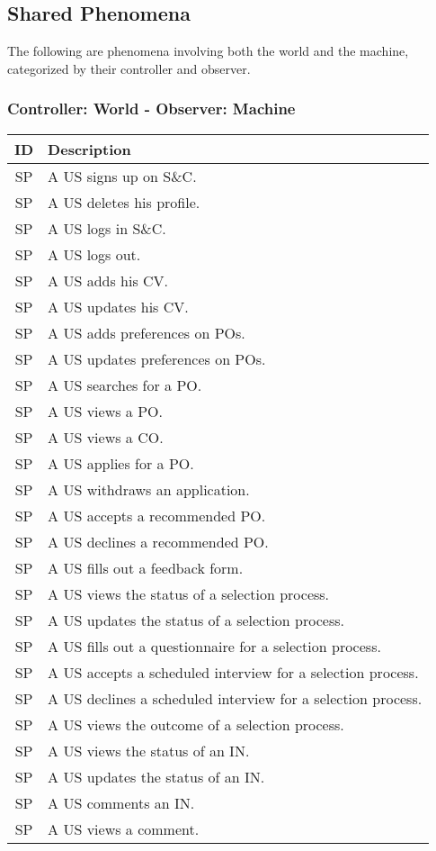 \subsection{Shared Phenomena}
The following are phenomena involving both the world and the machine, categorized by their controller and observer.

\subsubsection{Controller: World - Observer: Machine}
\setcounter{sp}{1}
\newcommand{\spc}{\thesp\stepcounter{sp}}
\renewcommand{\arraystretch}{1.5}
\begin{longtable}{|c|p{10.5cm}|}
    \hline \rowcolor{polimiblue!40}
    \textbf{ID} & \textbf{Description} \\ \hline
    SP\spc & A US signs up on S\&C. \\ \hline
    SP\spc & A US deletes his profile.\\ \hline
    SP\spc & A US logs in S\&C. \\ \hline
    SP\spc & A US logs out. \\ \hline
    SP\spc & A US adds his CV. \\ \hline
    SP\spc & A US updates his CV. \\ \hline
    SP\spc & A US adds preferences on POs. \\ \hline
    SP\spc & A US updates preferences on POs. \\ \hline
    SP\spc & A US searches for a PO. \\ \hline
    SP\spc & A US views a PO. \\ \hline
    SP\spc & A US views a CO. \\ \hline
    SP\spc & A US applies for a PO. \\ \hline
    SP\spc & A US withdraws an application. \\ \hline
    SP\spc & A US accepts a recommended PO. \\ \hline
    SP\spc & A US declines a recommended PO. \\ \hline
    SP\spc & A US fills out a feedback form. \\ \hline
    SP\spc & A US views the status of a selection process. \\ \hline
    SP\spc & A US updates the status of a selection process. \\ \hline
    SP\spc & A US fills out a questionnaire for a selection process. \\ \hline
    SP\spc & A US accepts a scheduled interview for a selection process. \\ \hline
    SP\spc & A US declines a scheduled interview for a selection process. \\ \hline
    SP\spc & A US views the outcome of a selection process. \\ \hline
    SP\spc & A US views the status of an IN. \\ \hline
    SP\spc & A US updates the status of an IN. \\ \hline
    SP\spc & A US comments an IN. \\ \hline
    SP\spc & A US views a comment. \\ \hline


\end{longtable}
